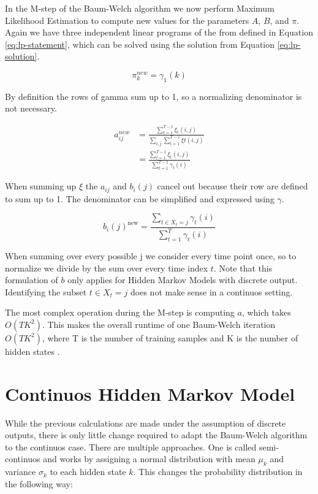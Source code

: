 In the M-step of the Baum-Welch algorithm we now perform Maximum Likelihood Estimation to compute new values for the parameters $A$, $B$, and $\pi$. Again we have three independent linear programs of the from defined in Equation \eqref{eq:lp-statement}, which can be solved using the solution from Equation \eqref{eq:lp-solution}. 

\begin{equation}
  \pi_{k}^{n e w}=\gamma_{1}(k) 
\end{equation}

By definition the rows of gamma sum up to 1, so a normalizing denominator is not necessary. 

\begin{equation}
   \begin{aligned}
   a_{i j}^{n e w}&=\frac{\sum_{t=1}^{T-1} \xi_{t}(i, j)}{\sum_{i,j}  \sum_{t=1}^{T-1} \xi{t}(i,j)} \\
   &=\frac{\sum_{t=1}^{T-1} \xi_{t}(i, j)}{\sum_{t=1}^{T-1} \gamma_{t}(i)} 
   \end{aligned}
\end{equation}

When summing up $\xi$ the $a_{ij}$ and $b_i(j)$ cancel out because their row are defined to sum up to 1. The denominator can be simplified and expressed using $\gamma$.

\begin{equation}
   b_{i}(j)^{\text {new}}=\frac{\sum_{t \in X_t = j} \gamma_{t}(i) }{\sum_{t=1}^{T} \gamma_{t}(i)}
\end{equation}

When summing over every possible j we consider every time point once, so to normalize we divide by the sum over every time index $t$. Note that this formulation of $b$ only applies for Hidden Markov Models with discrete output. Identifying the subset $t \in X_t=j$ does not make sense in a continuos setting. 

The most complex operation during the M-step is computing $a$, which takes $O(TK^2)$. This makes the overall runtime of one Baum-Welch iteration $O(TK^2)$, where T is the number of training samples and K is the number of hidden states \parencite{miningmassivedatasets}.

\section{Continuos Hidden Markov Model}

While the previous calculations are made under the assumption of discrete outputs, there is only little change required to adapt the Baum-Welch algorithm to the continuos case. There are multiple approaches. One is called semi-continuos and works by assigning a normal distribution with mean $\mu_k$ and variance $\sigma_k$ to each hidden state $k$. This changes the probability distribution in the following way:

